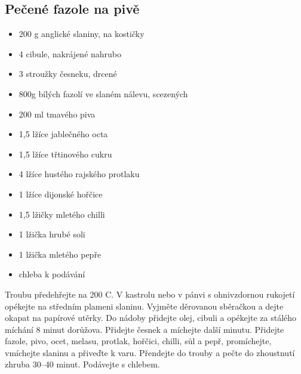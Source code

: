 \documentclass[10pt,a4paper]{article}
\newenvironment{myitemize}
{ \begin{itemize}
    \setlength{\itemsep}{0pt}
    \setlength{\parskip}{0pt}
    \setlength{\parsep}{0pt}     }
{ \end{itemize}                  }
\begin{document}
\subsection{Pečené fazole na pivě}
\begin{minipage}[t]{0,5\textwidth}
\begin{myitemize} 
\item 200 g anglické slaniny, na kostičky
\item 4 cibule, nakrájené nahrubo
\item 3 stroužky česneku, drcené
\item 800g bílých fazolí ve slaném nálevu, scezených
\item 200 ml tmavého piva 
\item 1,5 lžíce jablečného octa
\item 1,5 lžíce třtinového cukru
\item 4 lžíce hustého rajského protlaku
\item 1 lžíce dijonské hořčice
\item 1,5 lžičky mletého chilli
\item 1 lžička hrubé soli
\item 1 lžička mletého pepře
\item chleba k podávání
\end{myitemize}
\end{minipage}
\begin{minipage}[t]{0,5\textwidth}
Troubu předehřejte na 200 \degree C. V kastrolu nebo v pánvi s ohnivzdornou rukojetí opékejte na středním plameni slaninu. Vyjměte děrovanou sběračkou a dejte okapat na papírové utěrky. Do nádoby přidejte olej, cibuli a opékejte za stálého míchání 8 minut dorůžova. Přidejte česnek a míchejte další minutu. Přidejte fazole, pivo, ocet, melasu, protlak, hořčici, chilli, sůl a pepř, promíchejte, vmíchejte slaninu a přiveďte k varu. Přendejte do trouby a pečte do zhoustnutí zhruba 30–40 minut. Podávejte s chlebem.
\end{minipage}
\end{document}
